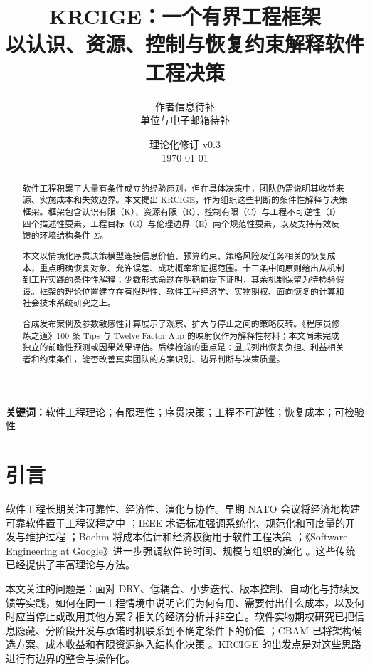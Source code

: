 \documentclass[11pt,a4paper]{ctexart}
\title{\textbf{KRCIGE：一个有界工程框架}\\[0.35em]
\large 以认识、资源、控制与恢复约束解释软件工程决策}
\author{作者信息待补\\[-0.1em]
\small 单位与电子邮箱待补}
\date{\small 理论化修订 v0.3\\[0.25em]\today}
\numberwithin{equation}{section}
\theoremstyle{definition}
\theoremstyle{plain}
\begin{document}
\maketitle

\begin{abstract}
软件工程积累了大量有条件成立的经验原则，但在具体决策中，团队仍需说明其收益来源、实施成本和失效边界。本文提出 KRCIGE，作为组织这些判断的条件性解释与决策框架。框架包含认识有限（K）、资源有限（R）、控制有限（C）与工程不可逆性（I）四个描述性要素，工程目标（G）与伦理边界（E）两个规范性要素，以及支持有效反馈的环境结构条件 $\Sigma$。

本文以情境化序贯决策模型连接信息价值、预算约束、策略风险及任务相关的恢复成本，重点明确恢复对象、允许误差、成功概率和证据范围。十三条中间原则给出从机制到工程实践的条件性解释；少数形式命题在明确前提下证明，其余机制保留为待检验假设。框架的理论位置建立在有限理性、软件工程经济学、实物期权、面向恢复的计算和社会技术系统研究之上。

合成发布案例及参数敏感性计算展示了观察、扩大与停止之间的策略反转。《程序员修炼之道》100 条 Tips 与 Twelve-Factor App 的映射仅作为解释性材料；本文尚未完成独立的前瞻性预测或因果效果评估。后续检验的重点是：显式列出恢复负担、利益相关者和约束条件，能否改善真实团队的方案识别、边界判断与决策质量。
\end{abstract}

\noindent\textbf{关键词：}软件工程理论；有限理性；序贯决策；工程不可逆性；恢复成本；可检验性

\section{引言}

软件工程长期关注可靠性、经济性、演化与协作。早期 NATO 会议将经济地构建可靠软件置于工程议程之中 \cite{nato1968}；IEEE 术语标准强调系统化、规范化和可度量的开发与维护过程 \cite{ieee1990}；Boehm 将成本估计和经济权衡用于软件工程决策 \cite{boehm1981}；《Software Engineering at Google》进一步强调软件跨时间、规模与组织的演化 \cite{winters2020}。这些传统已经提供了丰富理论与方法。

本文关注的问题是：面对 DRY、低耦合、小步迭代、版本控制、自动化与持续反馈等实践，如何在同一工程情境中说明它们为何有用、需要付出什么成本，以及何时应当停止或改用其他方案？相关的经济分析并非空白。软件实物期权研究已把信息隐藏、分阶段开发与承诺时机联系到不确定条件下的价值 \cite{sullivan1999}；CBAM 已将架构候选方案、成本收益和有限资源纳入结构化决策 \cite{asundi2001}。KRCIGE 的出发点是对这些思路进行有边界的整合与操作化。
\end{document}
